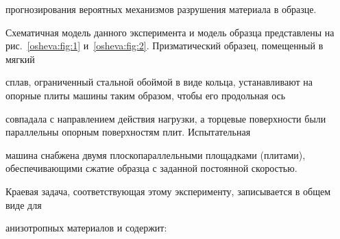 прогнозирования вероятных механизмов разрушения материала в образце.



Схематичная модель данного эксперимента и модель образца представлены на рис.~\ref{osheva:fig:1} и~\ref{osheva:fig:2}. Призматический образец, помещенный в мягкий

сплав, ограниченный стальной обоймой в виде кольца, устанавливают на опорные плиты машины таким образом, чтобы его продольная ось

совпадала с направлением действия нагрузки, а торцевые поверхности были параллельны опорным поверхностям плит. Испытательная

машина снабжена двумя плоскопараллельными площадками (плитами), обеспечивающими сжатие образца с заданной постоянной скоростью.









\smallskip



 Краевая задача, соответствующая этому эксперименту, записывается в общем виде для

анизотропных материалов и содержит:

